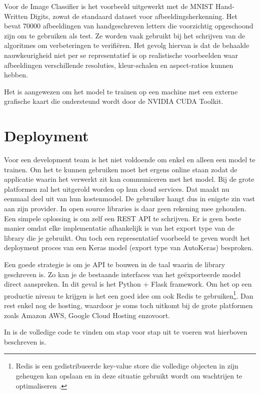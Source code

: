 Voor de Image Classifier is het voorbeeld uitgewerkt met de MNIST Hand-Written Digits, zowat de standaard dataset voor afbeeldingsherkenning. Het bevat 70000 afbeeldingen van handgeschreven letters die voorzichtig opgeschoond zijn om te gebruiken als test. Ze worden vaak gebruikt bij het schrijven van de algoritmes om verbeteringen te verifiëren. Het gevolg hiervan is dat de behaalde nauwkeurigheid niet per se representatief is op realistische voorbeelden waar afbeeldingen verschillende resoluties, kleur-schalen en aspect-ratios kunnen hebben.

Het is aangewezen om het model te trainen op een machine met een externe grafische kaart die ondersteund wordt door de NVIDIA CUDA Toolkit.

\section{Deployment}

Voor een development team is het niet voldoende om enkel en alleen een model te trainen. Om het te kunnen gebruiken moet het ergens online staan zodat de applicatie waarin het verwerkt zit kan communiceren met het model. Bij de grote platformen zal het uitgerold worden op hun cloud services. Dat maakt nu eenmaal deel uit van hun kostenmodel. De gebruiker hangt dus in enigste zin vast aan zijn provider. 
In open source libraries is daar geen rekening mee gehouden. Een simpele oplossing is om zelf een REST API te schrijven. Er is geen beste manier omdat elke implementatie afhankelijk is van het export type van de library die je gebruikt. Om toch een representatief voorbeeld te geven wordt het deployment proces van een Keras model (export type van AutoKeras) besproken. 

Een goede strategie is om je API te bouwen in de taal waarin de library geschreven is. Zo kan je de bestaande interfaces van het geëxporteerde model direct aanspreken. In dit geval is het Python + Flask framework. Om het op een productie niveau te krijgen is het een goed idee om ook Redis te gebruiken\footnote{Redis is een gedistribueerde key-value store die volledige objecten in zijn geheugen kan opslaan en in deze situatie gebruikt wordt om wachtrijen te optimaliseren \autocite{Adrian2018}.}. Dan rest enkel nog de hosting, waardoor je soms toch uitkomt bij de grote platformen zoals Amazon AWS, Google Cloud Hosting enzovoort.

In \textcite{Adrian2018} is de volledige code te vinden om stap voor stap uit te voeren wat hierboven beschreven is.
